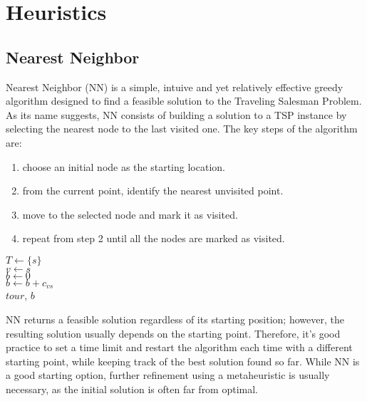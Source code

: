 \chapter{Heuristics}

\section{Nearest Neighbor}

Nearest Neighbor (NN) is a simple, intuive and yet relatively effective greedy algorithm designed to find a feasible solution to the Traveling Salesman Problem.
As its name suggests, NN consists of building a solution to a TSP instance by selecting the nearest node to the last visited one.
The key steps of the algorithm are:
\begin{enumerate}
    \item choose an initial node as the starting location.
    \item from the current point, identify the nearest unvisited point.
    \item move to the selected node and mark it as visited.
    \item repeat from step 2 until all the nodes are marked as visited.
\end{enumerate}

\begin{algorithm}[htbp]
    \BlankLine
    $T \gets \{s\}$\\
    $v \gets s$\\
    $b \gets 0$\\
    $b \gets b + c_{vs}$\\
    \Return $tour$, $b$\\
\end{algorithm}

NN returns a feasible solution regardless of its starting position; however, the resulting solution usually depends on the starting point.
Therefore, it's good practice to set a time limit and restart the algorithm each time with a different starting point, while keeping track of the best solution found so far.
While NN is a good starting option, further refinement using a metaheuristic is usually necessary, as the initial solution is often far from optimal.

